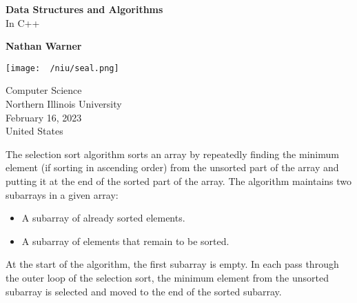 \documentclass{report}
\title{\Huge{}}
\author{\huge{Nathan Warner}}
\date{\huge{}}
\begin{document}
        \begin{titlepage}
       \begin{center}
           \vspace*{1cm}
    
           \textbf{Data Structures and Algorithms} \\
           In C++
    
           \vspace{0.5cm}
            
                
           \vspace{1.5cm}
    
           \textbf{Nathan Warner}
    
           \vfill
                
                
           \vspace{0.8cm}
         
           \texttt{[image: ~/niu/seal.png]}
                
           Computer Science \\
           Northern Illinois University\\
           February 16, 2023 \\
           United States\\
           
                
       \end{center}
    \end{titlepage}
    \tableofcontents
    \pagebreak 
    \bigbreak \noindent 
    \begin{concept}
        The selection sort algorithm sorts an array by repeatedly finding the minimum element (if sorting in ascending order) from the unsorted part of the array and putting it at the end of the sorted part of the array. The algorithm maintains two subarrays in a given array:
    \end{concept}
    \begin{itemize}
        \item A subarray of already sorted elements.
        \item A subarray of elements that remain to be sorted.
    \end{itemize}
    At the start of the algorithm, the first subarray is empty. In each pass through the outer loop of the selection sort, the minimum element from the unsorted subarray is selected and moved to the end of the sorted subarray.
    \bigbreak \noindent 
\end{document}

